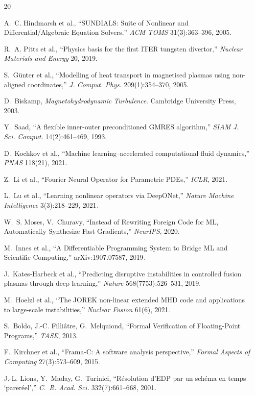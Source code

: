 \documentclass[11pt,twocolumn]{article}
\begin{document}
\begin{thebibliography}{20}

A.~C. Hindmarsh et al., ``SUNDIALS: Suite of Nonlinear and
Differential/Algebraic Equation Solvers,''
\textit{ACM TOMS} 31(3):363--396, 2005.

R.~A. Pitts et al., ``Physics basis for the first ITER tungsten divertor,''
\textit{Nuclear Materials and Energy} 20, 2019.

S.~G\"{u}nter et al., ``Modelling of heat transport in magnetised plasmas
using non-aligned coordinates,''
\textit{J. Comput. Phys.} 209(1):354--370, 2005.

D.~Biskamp, \textit{Magnetohydrodynamic Turbulence}.
Cambridge University Press, 2003.

Y.~Saad, ``A flexible inner-outer preconditioned GMRES algorithm,''
\textit{SIAM J. Sci. Comput.} 14(2):461--469, 1993.

D.~Kochkov et al., ``Machine learning–accelerated computational fluid
dynamics,'' \textit{PNAS} 118(21), 2021.

Z.~Li et al., ``Fourier Neural Operator for Parametric PDEs,''
\textit{ICLR}, 2021.

L.~Lu et al., ``Learning nonlinear operators via DeepONet,''
\textit{Nature Machine Intelligence} 3(3):218--229, 2021.

W.~S. Moses, V.~Churavy, ``Instead of Rewriting Foreign Code for ML,
Automatically Synthesize Fast Gradients,'' \textit{NeurIPS}, 2020.

M.~Innes et al., ``A Differentiable Programming System to Bridge ML and
Scientific Computing,'' arXiv:1907.07587, 2019.

J.~Kates-Harbeck et al., ``Predicting disruptive instabilities in
controlled fusion plasmas through deep learning,''
\textit{Nature} 568(7753):526--531, 2019.

M.~Hoelzl et al., ``The JOREK non-linear extended MHD code and applications
to large-scale instabilities,'' \textit{Nuclear Fusion} 61(6), 2021.

S.~Boldo, J.-C. Filliâtre, G.~Melquiond,
``Formal Verification of Floating-Point Programs,''
\textit{TASE}, 2013.

F.~Kirchner et al., ``Frama-C: A software analysis perspective,''
\textit{Formal Aspects of Computing} 27(3):573--609, 2015.

J.-L. Lions, Y.~Maday, G.~Turinici,
``R\'{e}solution d'EDP par un sch\'{e}ma en temps `parer\'{e}el',''
\textit{C.~R. Acad. Sci.} 332(7):661--668, 2001.

\end{thebibliography}
\end{document}
